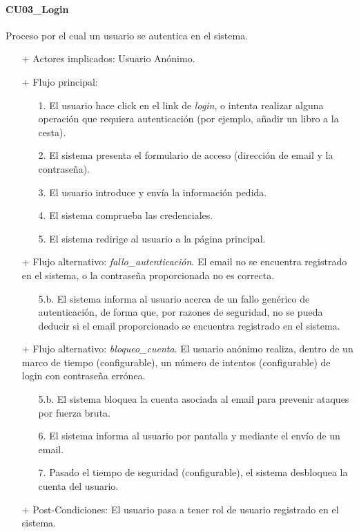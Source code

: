 \documentclass[a4paper]{article}
\begin{document}
            \paragraph{CU03\_Login}
                Proceso por el cual un usuario se autentica en el sistema.
                \begin{itemize}
                    \item[+] Actores implicados: Usuario Anónimo.
                    \item[+] Flujo principal:
                    \begin{enumerate}
                        \item[1.] El usuario hace click en el link de \emph{login}, o intenta realizar alguna operación que requiera autenticación (por ejemplo, añadir un libro a la cesta).
                        \item[2.] El sistema presenta el formulario de acceso (dirección de email y la contraseña).
                        \item[3.] El usuario introduce y envía la información pedida.
                        \item[4.] El sistema comprueba las credenciales.
                        \item[5.] El sistema redirige al usuario a la página principal.
                    \end{enumerate}
                    \item[+] Flujo alternativo: \emph{fallo\_autenticación}. El email no se encuentra registrado en el sistema, o la contraseña proporcionada no es correcta.
                    \begin{itemize}
                        \item[5.b.] El sistema informa al usuario acerca de un fallo genérico de autenticación, de forma que, por razones de seguridad, no se pueda deducir si el email proporcionado se encuentra registrado en el sistema.
                    \end{itemize}
                    \item[+] Flujo alternativo: \emph{bloqueo\_cuenta}. El usuario anónimo realiza, dentro de un marco de tiempo (configurable), un número de intentos (configurable) de login con contraseña errónea.
                    \begin{itemize}
                        \item[5.b.] El sistema bloquea la cuenta asociada al email para prevenir ataques por fuerza bruta.
                        \item[6.] El sistema informa al usuario por pantalla y mediante el envío de un email.
                        \item[7.] Pasado el tiempo de seguridad (configurable), el sistema desbloquea la cuenta del usuario.
                    \end{itemize}
                    \item[+] Post-Condiciones: El usuario pasa a tener rol de usuario registrado en el sistema.
                \end{itemize}
\end{document}
